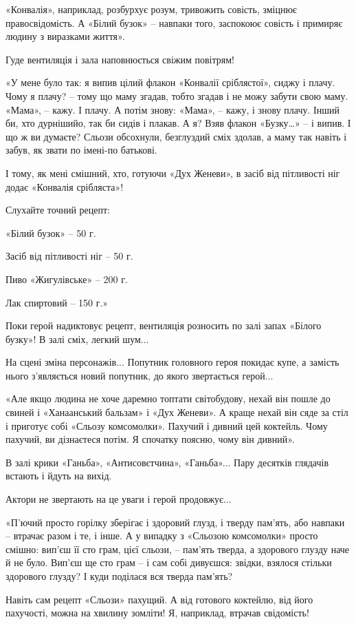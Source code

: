 «Конвалія», наприклад, розбурхує розум, тривожить совість, зміцнює
правосвідомість. А «Білий бузок» – навпаки того, заспокоює совість і примиряє
людину з виразками життя».

Гуде вентиляція і зала наповнюється свіжим повітрям!

«У мене було так: я випив цілий флакон «Конвалії сріблястої», сиджу і плачу.
Чому я плачу? – тому що маму згадав, тобто згадав і не можу забути свою маму.
«Мама», – кажу. І плачу. А потім знову: «Мама», – кажу, і знову плачу. Інший
би, хто дурнішийо, так би сидів і плакав. А я? Взяв флакон «Бузку…» – і випив.
І що ж ви думаєте? Сльози обсохнули, безглуздий сміх здолав, а маму так навіть
і забув, як звати по імені-по батькові.

І тому, як мені смішний, хто, готуючи «Дух Женеви», в засіб від пітливості ніг
додає «Конвалія срібляста»!

Слухайте точний рецепт:

«Білий бузок» – 50 г.

Засіб від пітливості ніг – 50 г.

Пиво «Жигулівське» – 200 г.

Лак спиртовий – 150 г.»

Поки герой надиктовує рецепт, вентиляція розносить по залі запах «Білого
бузку»! В залі сміх, легкий шум...

На сцені зміна персонажів... Попутник головного героя покидає купе, а замість
нього з’являється новий попутник, до якого звертається герой...

«Але якщо людина не хоче даремно топтати світобудову, нехай він пошле до свиней
і «Ханаанський бальзам» і «Дух Женеви». А краще нехай він сяде за стіл і
приготує собі «Сльозу комсомолки». Пахучий і дивний цей коктейль. Чому пахучий,
ви дізнаєтеся потім. Я спочатку поясню, чому він дивний».

В залі крики «Ганьба», «Антисовєтчина», «Ганьба»... Пару десятків глядачів
встають і йдуть на вихід.

Актори не звертають на це уваги і герой продовжує...

«П'ючий просто горілку зберігає і здоровий глузд, і тверду пам'ять, або навпаки
– втрачає разом і те, і інше. А у випадку з «Сльозою комсомолки» просто смішно:
вип'єш її сто грам, цієї сльози, – пам'ять тверда, а здорового глузду наче й не
було. Вип'єш ще сто грам – і сам собі дивуєшся: звідки, взялося стільки
здорового глузду? І куди поділася вся тверда пам'ять?

Навіть сам рецепт «Сльози» пахущий. А від готового коктейлю, від його
пахучості, можна на хвилину зомліти! Я, наприклад, втрачав свідомість!

